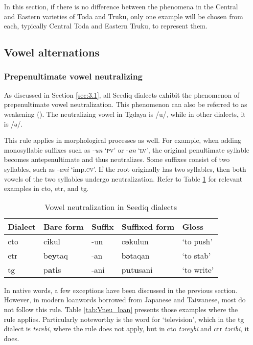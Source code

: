 In this section, if there is no difference between the phenomena in the Central and Eastern varieties of Toda and Truku, only one example will be chosen from each, typically Central Toda and Eastern Truku, to represent them.

\subsection{Vowel alternations}

\subsubsection{Prepenultimate vowel neutralizing}

As discussed in Section \ref{sec:3.1}, all Seediq dialects exhibit the phenomenon of prepenultimate vowel neutralization. This phenomenon can also be referred to as weakening (\cite[22--23]{Lee2018Trugrammar}). The neutralizing vowel in Tgdaya is /u/, while in other dialects, it is /ə/. 

This rule applies in morphological processes as well. For example, when adding monosyllabic suffixes such as -\textit{un} `\textsc{pv}' or -\textit{an} `\textsc{lv}', the original penultimate syllable becomes antepenultimate and thus neutralizes. Some suffixes consist of two syllables, such as -\textit{ani} `\acs{imp}.\textsc{cv}'. If the root originally has two syllables, then both vowels of the two syllables undergo neutralization. Refer to Table \ref{tab:Vneu} for relevant examples in \acl{cto}, \acl{etr}, and \acl{tg}.

\begin{table}[!htbp]
\centering
\caption{Vowel neutralization in Seediq dialects}
\label{tab:Vneu}
\begin{tabular}{lllll}
\hline
Dialect   & Bare form & Suffix & Suffixed form & Gloss      \\ \hline
\acl{cto} & c\textbf{i}kul     & -un    & c\textbf{ə}kulun       & `to push'  \\
\acl{etr} & b\textbf{ey}taq    & -an    & b\textbf{ə}taqan       & `to stab'  \\
\acl{tg}  & p\textbf{a}t\textbf{i}s     & -ani   & p\textbf{u}t\textbf{u}sani      & `to write' \\ \hline
\end{tabular}
\end{table}

In native words, a few exceptions have been discussed in the previous section. However, in modern loanwords borrowed from Japanese and Taiwanese, most do not follow this rule. Table \ref{tab:Vneu_loan} presents those examples where the rule applies. Particularly noteworthy is the word for `television', which in the \acl{tg} dialect is \textit{terebi}, where the rule does not apply, but in \acl{cto} \textit{təreybi} and \acl{ctr} \textit{təribi}, it does.


